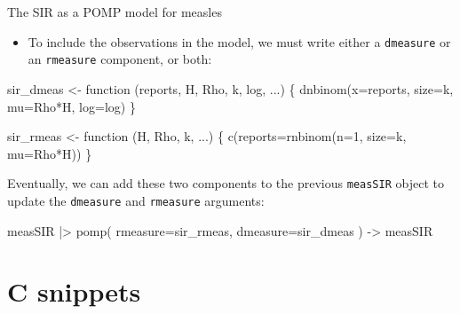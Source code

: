 \documentclass[
  ignorenonframetext,
  aspectratio=169,
  t]{beamer}
\newenvironment{Shaded}{\begin{snugshade}}{\end{snugshade}}
\newcommand{\AttributeTok}[1]{\textcolor[rgb]{0.40,0.45,0.13}{#1}}
\newcommand{\ControlFlowTok}[1]{\textcolor[rgb]{0.00,0.23,0.31}{#1}}
\newcommand{\DecValTok}[1]{\textcolor[rgb]{0.68,0.00,0.00}{#1}}
\newcommand{\FunctionTok}[1]{\textcolor[rgb]{0.28,0.35,0.67}{#1}}
\newcommand{\NormalTok}[1]{\textcolor[rgb]{0.00,0.23,0.31}{#1}}
\newcommand{\OtherTok}[1]{\textcolor[rgb]{0.00,0.23,0.31}{#1}}
\newcommand{\SpecialCharTok}[1]{\textcolor[rgb]{0.37,0.37,0.37}{#1}}
\providecommand{\tightlist}{%
  \setlength{\itemsep}{0pt}\setlength{\parskip}{0pt}}\usepackage{longtable,booktabs,array}
\theoremstyle{definition}
\begin{document}
\begin{frame}{The SIR as a POMP model for
measles}
\framebreak

\begin{itemize}
\tightlist
\item
  To include the observations in the model, we must write either a
  \texttt{dmeasure} or an \texttt{rmeasure} component, or both:
\end{itemize}

\begin{Shaded}
\begin{Highlighting}[]
\NormalTok{sir\_dmeas }\OtherTok{\textless{}{-}} \ControlFlowTok{function}\NormalTok{ (reports, H, Rho, k, log, ...) \{}
  \FunctionTok{dnbinom}\NormalTok{(}\AttributeTok{x=}\NormalTok{reports, }\AttributeTok{size=}\NormalTok{k, }\AttributeTok{mu=}\NormalTok{Rho}\SpecialCharTok{*}\NormalTok{H, }\AttributeTok{log=}\NormalTok{log)}
\NormalTok{\}}

\NormalTok{sir\_rmeas }\OtherTok{\textless{}{-}} \ControlFlowTok{function}\NormalTok{ (H, Rho, k, ...) \{}
  \FunctionTok{c}\NormalTok{(}\AttributeTok{reports=}\FunctionTok{rnbinom}\NormalTok{(}\AttributeTok{n=}\DecValTok{1}\NormalTok{, }\AttributeTok{size=}\NormalTok{k, }\AttributeTok{mu=}\NormalTok{Rho}\SpecialCharTok{*}\NormalTok{H))}
\NormalTok{\}}
\end{Highlighting}
\end{Shaded}

\framebreak

Eventually, we can add these two components to the previous
\texttt{measSIR} object to update the \texttt{dmeasure} and
\texttt{rmeasure} arguments:

\begin{Shaded}
\begin{Highlighting}[]
\NormalTok{measSIR }\SpecialCharTok{|\textgreater{}}
  \FunctionTok{pomp}\NormalTok{(}
    \AttributeTok{rmeasure=}\NormalTok{sir\_rmeas,}
    \AttributeTok{dmeasure=}\NormalTok{sir\_dmeas}
\NormalTok{  ) }\OtherTok{{-}\textgreater{}}\NormalTok{ measSIR}
\end{Highlighting}
\end{Shaded}
\end{frame}

\section{C snippets}\label{c-snippets}
\end{document}
